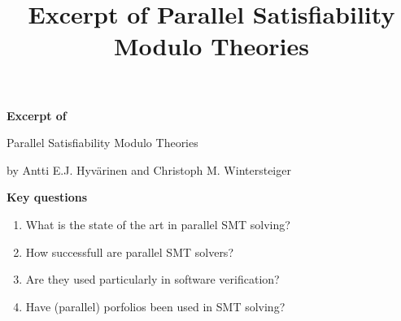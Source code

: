 \documentclass{scrartcl}
\title{Excerpt of Parallel Satisﬁability Modulo Theories}
\begin{document}
\begin{center}
    \Large{\textbf{Excerpt of}}

    \LARGE{Parallel Satisﬁability Modulo Theories}

    \large{by Antti E.J. Hyvärinen and Christoph M. Wintersteiger}
\end{center}

\vspace{1cm}

\begin{addmargin}[0.2\linewidth]{0.2\linewidth}
    \begin{center}
        \textbf{Key questions}
    \end{center}
    \begin{enumerate}[i]
        \item What is the state of the art in parallel SMT solving?
        \item How successfull are parallel SMT solvers?
        \item Are they used particularly in software verification?
        \item Have (parallel) porfolios been used in SMT solving?
    \end{enumerate}
\end{addmargin}

\vspace{1cm}
\end{document}
